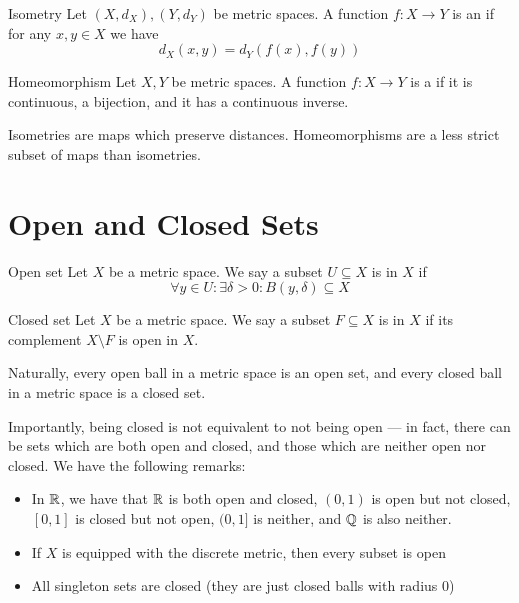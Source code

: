 \documentclass{styles/tufte}
\begin{document}
\begin{definition}{Isometry}{}
  Let $(X, d_X), (Y, d_Y)$ be metric spaces. A function $f: X \to Y$ is an  if for any $x, y \in X$ we have
  \[ d_X(x, y) = d_Y(f(x), f(y)) \]
\end{definition}

\begin{definition}{Homeomorphism}{}
  Let $X, Y$ be metric spaces. A function $f: X \to Y$ is a  if it is continuous, a bijection, and it has a continuous inverse.
\end{definition}

Isometries are maps which preserve distances. Homeomorphisms are a less strict subset of maps than isometries.



\section{Open and Closed Sets}

\begin{definition}{Open set}{}
  Let $X$ be a metric space. We say a subset $U \subseteq X$ is  in $X$ if
  \[ \forall y \in U: \exists \delta > 0: B(y, \delta) \subseteq X \]
\end{definition}

\begin{definition}{Closed set}{}
  Let $X$ be a metric space. We say a subset $F \subseteq X$ is  in $X$ if its complement $X \setminus F$ is open in $X$.
\end{definition}

Naturally, every open ball in a metric space is an open set, and every closed ball in a metric space is a closed set.

Importantly, being closed is not equivalent to not being open --- in fact, there can be sets which are both open and closed, and those which are neither open nor closed. We have the following remarks:
\begin{itemize}
  \item In $\mathbb{R}$, we have that $\mathbb{R}$ is both open and closed, $(0, 1)$ is open but not closed, $[0, 1]$ is closed but not open, $(0, 1]$ is neither, and $\mathbb{Q}$ is also neither.
  \item If $X$ is equipped with the discrete metric, then every subset is open
  \item All singleton sets are closed (they are just closed balls with radius $0$)
\end{itemize}
\end{document}

